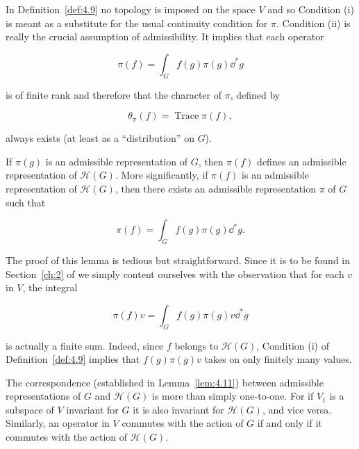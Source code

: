 \begin{remark}\label{rem:4.10}

In Definition~\ref{def:4.9} no topology is imposed on the space $V$ and so Condition (i) is meant as a substitute for the usual continuity condition for $\pi$. Condition (ii) is really the crucial assumption of admissibility. It implies that each operator

\[
\pi(f) = \int_G f(g)\pi(g)\dd^{*}g
\]

is of finite rank and therefore that the character of $\pi$, defined by

\[
\theta_{\pi}(f) = \operatorname{Trace}\pi(f),
\]

always exists (at least as a ``distribution'' on $G$).

\end{remark}

\begin{lemma}\label{lem:4.11}

If $\pi(g)$ is an admissible representation of $G$, then $\pi(f)$ defines an admissible representation of $\mathcal{H}(G)$. More significantly, if $\pi(f)$ is an admissible representation of $\mathcal{H}(G)$, then there exists an admissible representation $\pi$ of $G$ such that

\[
\pi(f) = \int_G f(g)\pi(g)\dd^{*}g.
\]

\end{lemma}

The proof of this lemma is tedious but straightforward. Since it is to be found in Section~\ref{ch:2} of \cite{JacquetLanglands} we simply content ourselves with the observation that for each $v$ in $V$, the integral

\[
\pi(f)v = \int_G f(g)\pi(g)v\dd^{*}g
\]

is actually a finite sum. Indeed, since $f$ belongs to $\mathcal{H}(G)$, Condition (i) of Definition~\ref{def:4.9} implies that $f(g)\pi(g)v$ takes on only finitely many values.

\begin{remark}\label{rem:4.12}

The correspondence (established in Lemma~\ref{lem:4.11}) between admissible representations of $G$ and $\mathcal{H}(G)$ is more than simply one-to-one. For if $V_1$ is a subspace of $V$ invariant for $G$ it is also invariant for $\mathcal{H}(G)$, and vice versa. Similarly, an operator in $V$ commutes with the action of $G$ if and only if it commutes with the action of $\mathcal{H}(G)$.

\end{remark}

